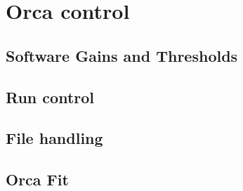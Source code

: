 
\chapter{Orca control}
\label{ch:OrcaControl}


    \section{Software Gains and Thresholds}
    \label{ch:OrcaControl:sec:SoftwareGainsThresholds}

    \section{Run control}
    \label{ch:OrcaControl:sec:RunControl}
    
    \section{File handling}
    \label{ch:OrcaControl:sec:FileHandling}

    \section{Orca Fit}
    \label{ch:OrcaControl:sec:OrcaFit}
